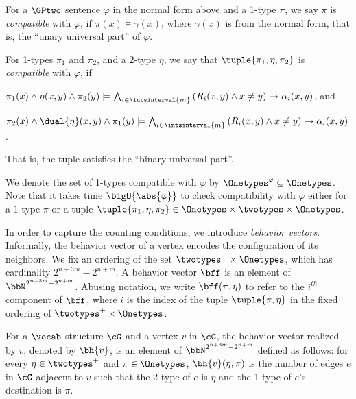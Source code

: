 \begin{definition}
    For a $\GPtwo$ sentence $\varphi$ in the normal form above and a 1-type $\pi$,
    we say $\pi$ is \emph{compatible} with $\varphi$,
    if $\pi(x) \models \gamma(x)$, where $\gamma(x)$ is from the normal form,
    that is, the ``unary universal part'' of $\varphi$.

    For  1-types $\pi_1$ and $\pi_2$, and a 2-type $\eta$,
    we say that $\tuple{\pi_1, \eta, \pi_2}$ is \emph{compatible} with $\varphi$,
    if
    \begin{compactitem}
        \item $\pi_1(x) \land \eta(x, y) \land \pi_2(y) \models
        \bigwedge_{i \in \intsinterval{m}} \left(R_i(x,y) \land x \neq y\right) \to \alpha_i(x, y)$, and
        \item $\pi_2(x) \land \dual{\eta}(x, y) \land \pi_1(y) \models
        \bigwedge_{i \in \intsinterval{m}} \left(R_i(x,y) \land x \neq y\right) \to \alpha_i(x, y)$.
    \end{compactitem}
    That is, the tuple satisfies the ``binary universal part''.
\end{definition}
We denote the set of 1-types compatible with $\varphi$ by $\Onetypes^\varphi \subseteq \Onetypes$.
Note that it takes time $\bigO{\abs{\varphi}}$ to check compatibility with $\varphi$ either for a $1$-type $\pi$  or a tuple $\tuple{\pi_1, \eta, \pi_2} \in \Onetypes \times \twotypes \times \Onetypes$.

In order to capture the counting conditions, we introduce \emph{behavior vectors}.
Informally, the behavior vector of a vertex encodes the configuration of its neighbors.
We fix an ordering of the set $\twotypes^+ \times \Onetypes$,
which has cardinality $2^{n+3m}-2^{n+m}$.
A behavior vector $\bff$ is an element of $\bbN^{2^{n+3m}-2^{n+m}}$.
Abusing notation, we write $\bff(\pi, \eta)$
to refer to the $i^{th}$ component of $\bff$,
where $i$ is the index of the tuple $\tuple{\pi, \eta}$ in the fixed ordering of $\twotypes^+ \times \Onetypes$.

\begin{definition}
    For a $\vocab$-structure $\cG$ and a vertex $v$ in $\cG$,
    the behavior vector realized by $v$,
    denoted by $\bh{v}$, is an element of $\bbN^{2^{n+3m}-2^{n+m}}$ defined as follows:
    for every $\eta \in \twotypes^+$ and $\pi \in \Onetypes$,
    $\bh{v}(\eta, \pi)$ is the number of edges $e$ in $\cG$ adjacent to $v$
    such that the 2-type of $e$ is $\eta$ and the 1-type of $e$'s destination is $\pi$.
\end{definition}

